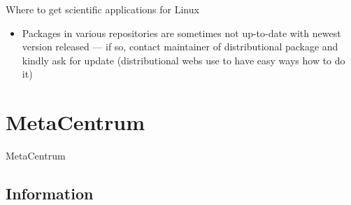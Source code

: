 \documentclass[compress, xelatex, 11pt, xcolor=svgnames, aspectratio=169,
	hyperref={
		bookmarks=true,
		unicode=true,
		colorlinks=true,
		pdftitle={Linux, command line and MetaCentrum},
		plainpages=false,
		pdfauthor={Vojtech Zeisek},
		pdfsubject={Course about use of Linux command line, writing shell scripts and using MetaCentrum of CESNET},
		pdfcreator={XeLaTeX},
		pdfkeywords={Linux, GNU, BASH, shell, command line, MetaCentrum},
		linkcolor=DarkRed, %
		anchorcolor=DarkBlue, %
		citecolor=Indigo, %
		filecolor=NavyBlue, %
		menucolor=DarkMagenta, %
		urlcolor=DarkBlue, %
		},
	url={hyphens, lowtilde} %
	]{beamer}
\begin{document}
\begin{frame}[allowframebreaks]{Where to get scientific applications for Linux}
\begin{itemize}
		\begin{itemize}
			\item Distributions sometimes provide packages at least for part of the packages of such languages --- typically at least for Python, Perl or R --- this is especially convenient for packages having plenty of complex dependencies
		\end{itemize}
		\item Packages in various repositories are sometimes not up-to-date with newest version released --- if so, contact maintainer of distributional package and kindly ask for update (distributional webs use to have easy ways how to do it)
	\end{itemize}
\end{frame}

\section{MetaCentrum}

\begin{frame}{MetaCentrum}
	\tableofcontents[currentsection, sectionstyle=show/hide, hideothersubsections]
\end{frame}

\subsection{Information}
\end{document}
